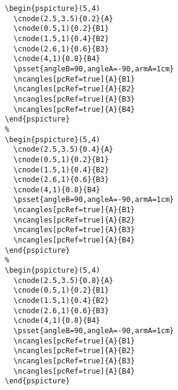 \documentclass[11pt]{article}
\begin{document}

\begin{lstlisting}
\begin{pspicture}(5,4)
  \cnode(2.5,3.5){0.2}{A}
  \cnode(0.5,1){0.2}{B1}
  \cnode(1.5,1){0.4}{B2}
  \cnode(2.6,1){0.6}{B3}
  \cnode(4,1){0.8}{B4}
  \psset{angleB=90,angleA=-90,armA=1cm}
  \ncangles[pcRef=true]{A}{B1}
  \ncangles[pcRef=true]{A}{B2}
  \ncangles[pcRef=true]{A}{B3}
  \ncangles[pcRef=true]{A}{B4}
\end{pspicture}
%
\begin{pspicture}(5,4)
  \cnode(2.5,3.5){0.4}{A}
  \cnode(0.5,1){0.2}{B1}
  \cnode(1.5,1){0.4}{B2}
  \cnode(2.6,1){0.6}{B3}
  \cnode(4,1){0.8}{B4}
  \psset{angleB=90,angleA=-90,armA=1cm}
  \ncangles[pcRef=true]{A}{B1}
  \ncangles[pcRef=true]{A}{B2}
  \ncangles[pcRef=true]{A}{B3}
  \ncangles[pcRef=true]{A}{B4}
\end{pspicture}
%
\begin{pspicture}(5,4)
  \cnode(2.5,3.5){0.8}{A}
  \cnode(0.5,1){0.2}{B1}
  \cnode(1.5,1){0.4}{B2}
  \cnode(2.6,1){0.6}{B3}
  \cnode(4,1){0.8}{B4}
  \psset{angleB=90,angleA=-90,armA=1cm}
  \ncangles[pcRef=true]{A}{B1}
  \ncangles[pcRef=true]{A}{B2}
  \ncangles[pcRef=true]{A}{B3}
  \ncangles[pcRef=true]{A}{B4}
\end{pspicture}
\end{lstlisting}
\end{document}
